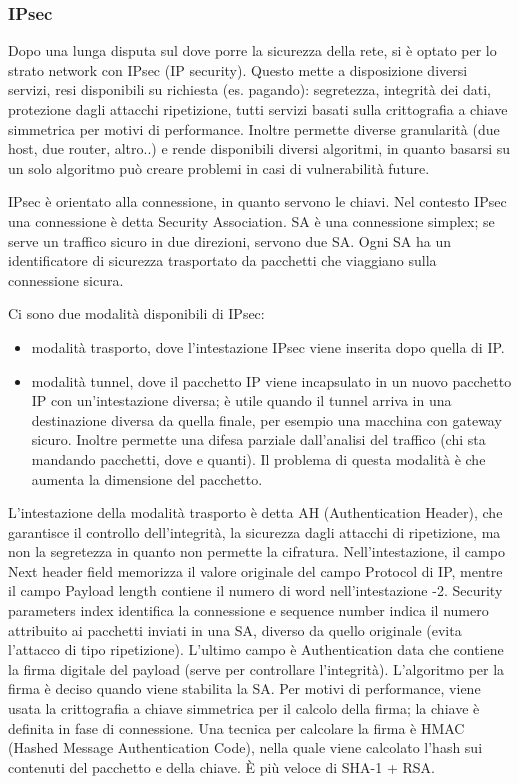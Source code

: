 \subsubsection{IPsec} %
Dopo una lunga disputa sul dove porre la sicurezza della rete, si è optato per lo strato network con IPsec (IP security).
Questo mette a disposizione diversi servizi, resi disponibili su richiesta (es. pagando): segretezza, integrità dei dati, protezione dagli attacchi ripetizione, tutti servizi basati sulla crittografia a chiave simmetrica per motivi di performance.
Inoltre permette diverse granularità (due host, due router, altro..) e rende disponibili diversi algoritmi, in quanto basarsi su un solo algoritmo può creare problemi in casi di vulnerabilità future.

IPsec è orientato alla connessione, in quanto servono le chiavi.
Nel contesto IPsec una connessione è detta Security Association.
SA è una connessione simplex; se serve un traffico sicuro in due direzioni, servono due SA.
Ogni SA ha un identificatore di sicurezza trasportato da pacchetti che viaggiano sulla connessione sicura.

Ci sono due modalità disponibili di IPsec:
\begin{itemize}
\item modalità trasporto, dove l'intestazione IPsec viene inserita dopo quella di IP.
\item modalità tunnel, dove il pacchetto IP viene incapsulato in un nuovo pacchetto IP con un'intestazione diversa; è utile quando il tunnel arriva in una destinazione diversa da quella finale, per esempio una macchina con gateway sicuro. Inoltre permette una difesa parziale dall'analisi del traffico (chi sta mandando pacchetti, dove e quanti). Il problema di questa modalità è che aumenta la dimensione del pacchetto.
\end{itemize}

L'intestazione della modalità trasporto è detta AH (Authentication Header), che garantisce il controllo dell'integrità, la sicurezza dagli attacchi di ripetizione, ma non la segretezza in quanto non permette la cifratura.
Nell'intestazione, il campo Next header field memorizza il valore originale del campo Protocol di IP, mentre il campo Payload length contiene il numero di word nell'intestazione -2.
Security parameters index identifica la connessione e sequence number indica il numero attribuito ai pacchetti inviati in una SA, diverso da quello originale (evita l'attacco di tipo ripetizione).
L'ultimo campo è Authentication data che contiene la firma digitale del payload (serve per controllare l'integrità).
L'algoritmo per la firma è deciso quando viene stabilita la SA.
Per motivi di performance, viene usata la crittografia a chiave simmetrica per il calcolo della firma;
la chiave è definita in fase di connessione.
Una tecnica per calcolare la firma è HMAC (Hashed Message Authentication Code), nella quale viene calcolato l'hash sui contenuti del pacchetto e della chiave.
\`E più veloce di SHA-1 + RSA.

